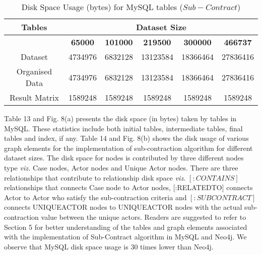 \documentclass[11pt]{article}
\begin{document}
{{\begin{table}
\centering
\begin{tabular}{|c|c|c|c|c|c|}
  \hline
      \textbf{Tables} & \multicolumn{5}{|c|}{\textbf{Dataset Size}}\\
    \hline
    & \textbf{65000}& \textbf{101000} & \textbf{219500}& \textbf{300000} & \textbf{466737}\\ \hline
     Dataset & 4734976 & 6832128 & 13123584 & 18366464 & 27836416\\ \hline
    Organised Data & 4734976 & 6832128 & 13123584 & 18366464 & 27836416\\ \hline
    Result Matrix & 1589248 & 1589248 & 1589248 & 1589248 & 1589248\\ \hline
  \end{tabular}
\caption{\small Disk Space Usage (bytes) for MySQL tables ($Sub-Contract$)}
\end{table}
\par{Table 13 and Fig. 8(a) presents the disk space (in bytes) taken by tables in MySQL. These statistics include both initial tables, intermediate tables, final tables and index, if any. Table 14 and Fig. 8(b) shows the disk usage of various graph elements for the implementation of sub-contraction algorithm for different dataset sizes. The disk space for nodes is contributed by three different nodes type \emph{viz.} Case nodes, Actor nodes and Unique Actor nodes. There are three relationships that contribute to relationship disk space \emph{viz.} $[:CONTAINS]$ relationships that connects Case node to Actor nodes, [:RELATED\textunderscore TO] connects Actor to Actor who satisfy the sub-contraction criteria and $[:SUBCONTRACT]$ connects UNIQUEACTOR nodes to UNIQUEACTOR nodes with the actual sub-contraction value between the unique actors. Readers are suggested to refer to Section 5 for better understanding of the tables and graph elements associated with the implementation of Sub-Contract algorithm in MySQL and Neo4j. We observe that MySQL disk space usage is 30 times lower than Neo4j. }



}}
\end{document}

